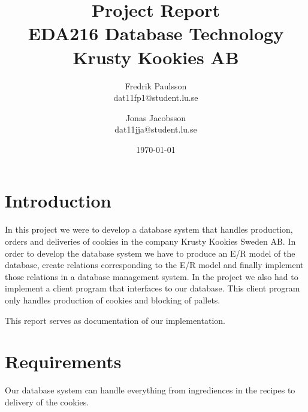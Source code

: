 \documentclass[a4paper]{article}
\title{Project Report \\ EDA216 Database Technology \\ Krusty Kookies AB}
\date{\today}
\author{Fredrik Paulsson \\ dat11fp1@student.lu.se \and Jonas Jacobsson \\ dat11jja@student.lu.se}
\begin{document}
\maketitle
\newpage


\section{Introduction}
In this project we were to develop a database system that handles production, orders and deliveries of cookies in the company Krusty Kookies Sweden AB. In order to develop the database system we have to produce an E/R model of the database, create relations corresponding to the E/R model and finally implement those relations in a database management system. In the project we also had to implement a client program that interfaces to our database. This client program only handles production of cookies and blocking of pallets.

This report serves as documentation of our implementation. 

\section{Requirements}
Our database system can handle everything from ingrediences in the recipes to delivery of the cookies. 
\end{document}
